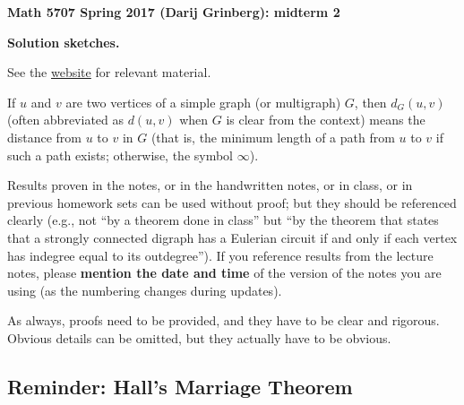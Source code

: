 \documentclass[numbers=enddot,12pt,final,onecolumn,notitlepage]{scrartcl}%
\theoremstyle{definition}
\newcommand{\tup}[1]{\left( #1 \right)}
\begin{document}
\begin{center}
\textbf{Math 5707 Spring 2017 (Darij Grinberg): midterm 2}

\textbf{Solution sketches.}
\end{center}

See the \href{http://www.cip.ifi.lmu.de/~grinberg/t/17s}{website} for relevant material.

If $u$ and $v$ are two vertices of a simple graph (or multigraph) $G$,
then $d_G \tup{u, v}$ (often abbreviated as $d \tup{u, v}$ when $G$
is clear from the context) means the distance from $u$ to $v$ in $G$
(that is, the minimum length of a path from $u$ to $v$ if such a path
exists; otherwise, the symbol $\infty$).

{\small Results proven in the notes, or in the handwritten notes, or in class, or in previous homework sets can be used without proof; but they should be referenced clearly (e.g., not ``by a theorem done in class'' but ``by the theorem that states that a strongly connected digraph has a Eulerian circuit if and only if each vertex has indegree equal to its outdegree'').
If you reference results from the lecture notes, please \textbf{mention the date and time} of the version of the notes you are using (as the numbering changes during updates).

As always, proofs need to be provided, and they have to be clear and rigorous. Obvious details can be omitted, but they actually have to be obvious.}


\tableofcontents

\subsection{Reminder: Hall's Marriage Theorem}
\end{document}
